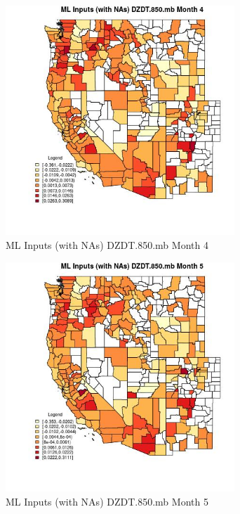 \begin{figure} 
\centering  
\includegraphics[width=0.77\textwidth]{Code_Outputs/Report_ML_input_PM25_Step4_part_f_de_duplicated_aveswNAs_CountyDZDT850mbmedianMonth4.jpg} 
\caption{\label{fig:Report_ML_input_PM25_Step4_part_f_de_duplicated_aveswNAsCountyDZDT850mbmedianMonth4}ML Inputs (with NAs) DZDT.850.mb Month 4} 
\end{figure} 
 

\clearpage 

\begin{figure} 
\centering  
\includegraphics[width=0.77\textwidth]{Code_Outputs/Report_ML_input_PM25_Step4_part_f_de_duplicated_aveswNAs_CountyDZDT850mbmedianMonth5.jpg} 
\caption{\label{fig:Report_ML_input_PM25_Step4_part_f_de_duplicated_aveswNAsCountyDZDT850mbmedianMonth5}ML Inputs (with NAs) DZDT.850.mb Month 5} 
\end{figure} 
 

